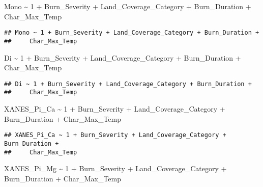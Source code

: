 \documentclass[
]{article}
\newenvironment{Shaded}{\begin{snugshade}}{\end{snugshade}}
\newcommand{\DecValTok}[1]{\textcolor[rgb]{0.00,0.00,0.81}{#1}}
\newcommand{\NormalTok}[1]{#1}
\newcommand{\SpecialCharTok}[1]{\textcolor[rgb]{0.00,0.00,0.00}{#1}}
\begin{document}
\begin{Shaded}
\begin{Highlighting}[]
\NormalTok{Mono }\SpecialCharTok{\textasciitilde{}} \DecValTok{1} \SpecialCharTok{+}\NormalTok{ Burn\_Severity }\SpecialCharTok{+}\NormalTok{ Land\_Coverage\_Category }\SpecialCharTok{+}\NormalTok{ Burn\_Duration }\SpecialCharTok{+}\NormalTok{ Char\_Max\_Temp}
\end{Highlighting}
\end{Shaded}

\begin{verbatim}
## Mono ~ 1 + Burn_Severity + Land_Coverage_Category + Burn_Duration + 
##     Char_Max_Temp
\end{verbatim}

\begin{Shaded}
\begin{Highlighting}[]
\NormalTok{Di }\SpecialCharTok{\textasciitilde{}} \DecValTok{1} \SpecialCharTok{+}\NormalTok{ Burn\_Severity }\SpecialCharTok{+}\NormalTok{ Land\_Coverage\_Category }\SpecialCharTok{+}\NormalTok{ Burn\_Duration }\SpecialCharTok{+}\NormalTok{ Char\_Max\_Temp}
\end{Highlighting}
\end{Shaded}

\begin{verbatim}
## Di ~ 1 + Burn_Severity + Land_Coverage_Category + Burn_Duration + 
##     Char_Max_Temp
\end{verbatim}

\begin{Shaded}
\begin{Highlighting}[]
\NormalTok{XANES\_Pi\_Ca }\SpecialCharTok{\textasciitilde{}} \DecValTok{1} \SpecialCharTok{+}\NormalTok{ Burn\_Severity }\SpecialCharTok{+}\NormalTok{ Land\_Coverage\_Category }\SpecialCharTok{+}\NormalTok{ Burn\_Duration }\SpecialCharTok{+}\NormalTok{ Char\_Max\_Temp}
\end{Highlighting}
\end{Shaded}

\begin{verbatim}
## XANES_Pi_Ca ~ 1 + Burn_Severity + Land_Coverage_Category + Burn_Duration + 
##     Char_Max_Temp
\end{verbatim}

\begin{Shaded}
\begin{Highlighting}[]
\NormalTok{XANES\_Pi\_Mg }\SpecialCharTok{\textasciitilde{}} \DecValTok{1} \SpecialCharTok{+}\NormalTok{ Burn\_Severity }\SpecialCharTok{+}\NormalTok{ Land\_Coverage\_Category }\SpecialCharTok{+}\NormalTok{ Burn\_Duration }\SpecialCharTok{+}\NormalTok{ Char\_Max\_Temp}
\end{Highlighting}
\end{Shaded}
\end{document}
